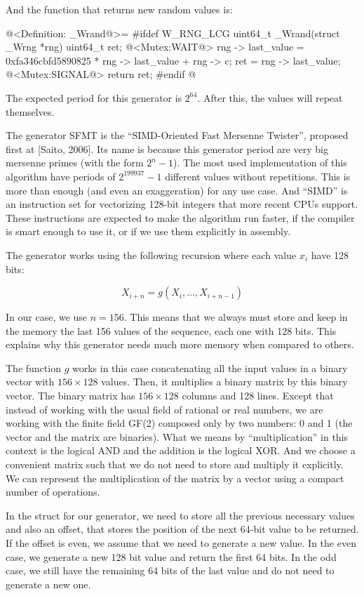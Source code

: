 And the function that returns new random values is:

\iniciocodigo
@<Definition: \_Wrand@>=
#ifdef W_RNG_LCG
uint64_t _Wrand(struct _Wrng *rng){
  uint64_t ret;
  @<Mutex:WAIT@>
  rng -> last_value = 0xfa346cbfd5890825 * rng -> last_value + rng -> c;
  ret = rng -> last_value;
  @<Mutex:SIGNAL@>
  return ret;
}
#endif
@
\fimcodigo

The expected period for this generator is $2^{64}$. After this, the
values will repeat themselves.


The generator SFMT is the ``SIMD-Oriented Fast Mersenne Twister'',
proposed first at [Saito, 2006]. Its name is because this generator
period are very big mersenne primes (with the form $2^n-1$). The most
used implementation of this algorithm have periods of $2^{199937}-1$
different values without repetitions. This is more than enough (and
even an exaggeration) for any use case. And ``SIMD'' is an instruction
set for vectorizing 128-bit integers that more recent CPUs
support. These instructions are expected to make the algorithm run
faster, if the compiler is smart enough to use it, or if we use them
explicitly in assembly.

The generator works using the following recursion where each value
$x_i$ have 128 bits:

$$
X_{i+n}=g(X_i, \ldots, X_{i+n-1})
$$

In our case, we use $n=156$. This means that we always must store and
keep in the memory the last 156 values of the sequence, each one with
128 bits. This explains why this generator needs much more memory when
compared to others.

The function $g$ works in this case concatenating all the input values
in a binary vector with $156 \times 128$ values. Then, it multiplies a
binary matrix by this binary vector. The binary matrix has $156 \times
128$ columns and 128 lines. Except that instead of working with the
usual field of rational or real numbers, we are working with the
finite field GF(2) composed only by two numbers: 0 and 1 (the vector
and the matrix are binaries). What we means by ``multiplication'' in
this context is the logical AND and the addition is the logical
XOR. And we choose a convenient matrix such that we do not need to
store and multiply it explicitly. We can represent the multiplication
of the matrix by a vector using a compact number of operations.

In the struct for our generator, we need to store all the previous
necessary values and also an offset, that stores the position of the
next 64-bit value to be returned. If the offset is even, we assume
that we need to generate a new value. In the even case, we generate a
new 128 bit value and return the first 64 bits. In the odd case, we
still have the remaining 64 bits of the last value and do not need to
generate a new one.


